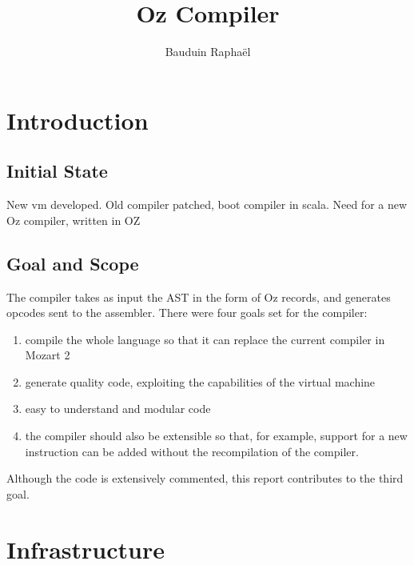 \documentclass[a4paper]{memoir}
\author{Bauduin Raphaël}
\title{Oz Compiler}
\begin{document}
\lstset{language=Oz,basicstyle=\ttfamily\small,columns=fullflexible}


\ifdraftdoc
{}
\fi

\immediate{} 

\maketitle
\tableofcontents


\chapter{Introduction}
\section{Initial State}
New vm developed.
Old compiler patched, boot compiler in scala.
Need for a new Oz compiler, written in OZ

\section{Goal and Scope}
The compiler takes as input the AST in the form of Oz records, and generates opcodes sent to the assembler. 
There were four goals set for the compiler:
\begin{enumerate}
  \item compile the whole language so that it can replace the current compiler in Mozart 2
  \item generate quality code, exploiting the capabilities of the virtual machine
  \item easy to understand and modular code
  \item the compiler should also be extensible so that, for example, support for a new instruction can be added without the recompilation of the compiler.
\end{enumerate}
Although the code is extensively commented, this report contributes to the third goal.

\chapter{Infrastructure}
\end{document}
